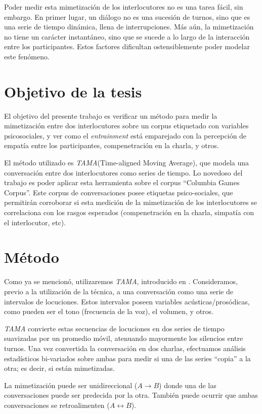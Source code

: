 \documentclass[a4paper,11pt]{article}
\begin{document}
Poder medir esta mimetización de los interlocutores no es una tarea fácil, sin embargo. En primer lugar, un diálogo no es una sucesión de turnos, sino que es una serie de tiempo dinámica, llena de interrupciones. Más aún, la mimetización no tiene un carácter instantáneo, sino que se sucede a lo largo de la interacción entre los participantes. Estos factores dificultan ostensiblemente poder modelar este fenómeno.

\section*{Objetivo de la tesis}

El objetivo del presente trabajo es verificar un método para medir la mimetización entre dos interlocutores sobre un corpus etiquetado con variables psicosociales, y ver como el \emph{entrainment} está emparejado con la percepción de empatía entre los participantes, compenetración en la charla, y otros.

El método utilizado es \emph{TAMA}(Time-aligned Moving Average), que modela una conversación entre dos interlocutores como series de tiempo. Lo novedoso del trabajo es poder aplicar esta herramienta sobre el corpus ``Columbia Games Corpus''. Este corpus de conversaciones posee etiquetas psico-sociales, que permitirán corroborar si esta medición de la mimetización de los interlocutores se correlaciona con los rasgos esperados (compenetración en la charla, simpatía con el interlocutor, etc).

\section*{Método}

Como ya se mencionó, utilizaremos \emph{TAMA}, introducido en \cite{KOU2009}. Consideramos, previo a la utilización de la técnica, a una conversación como una serie de intervalos de locuciones. Estos intervalos poseen variables acústicas/prosódicas, como pueden ser el tono (frecuencia de la voz), el volumen, y otros.

\emph{TAMA} convierte estas secuencias de locuciones en dos series de tiempo suavizadas por un promedio móvil, atenuando mayormente los silencios entre turnos. Una vez convertida la conversación en dos charlas, efectuamos análisis estadísticos bi-variados sobre ambas para medir si una de las series ``copia'' a la otra; es decir, si están mimetizadas.

La mimetización puede ser unidireccional ($A \rightarrow B$) donde una de las conversaciones puede ser predecida por la otra. También puede ocurrir que ambas conversaciones se retroalimenten ($A \leftrightarrow B$).
\end{document}
